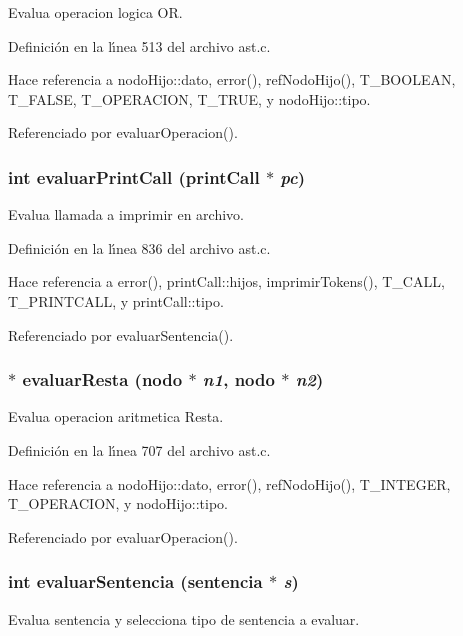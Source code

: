Evalua operacion logica OR. 



Definici\'{o}n en la l\'{\i}nea 513 del archivo ast.c.

Hace referencia a nodo\-Hijo::dato, error(), ref\-Nodo\-Hijo(), T\_\-BOOLEAN, T\_\-FALSE, T\_\-OPERACION, T\_\-TRUE, y nodo\-Hijo::tipo.

Referenciado por evaluar\-Operacion().
\subsubsection{\setlength{\rightskip}{0pt plus 5cm}int evaluar\-Print\-Call ({\bf print\-Call} $\ast$ {\em pc})}\label{ast_8h_a57}


Evalua llamada a imprimir en archivo. 



Definici\'{o}n en la l\'{\i}nea 836 del archivo ast.c.

Hace referencia a error(), print\-Call::hijos, imprimir\-Tokens(), T\_\-CALL, T\_\-PRINTCALL, y print\-Call::tipo.

Referenciado por evaluar\-Sentencia().
\subsubsection{$\ast$ evaluar\-Resta ({\bf nodo} $\ast$ {\em n1}, {\bf nodo} $\ast$ {\em n2})}\label{ast_8h_a51}


Evalua operacion aritmetica Resta. 



Definici\'{o}n en la l\'{\i}nea 707 del archivo ast.c.

Hace referencia a nodo\-Hijo::dato, error(), ref\-Nodo\-Hijo(), T\_\-INTEGER, T\_\-OPERACION, y nodo\-Hijo::tipo.

Referenciado por evaluar\-Operacion().
\subsubsection{\setlength{\rightskip}{0pt plus 5cm}int evaluar\-Sentencia ({\bf sentencia} $\ast$ {\em s})}\label{ast_8h_a37}


Evalua sentencia y selecciona tipo de sentencia a evaluar. 



